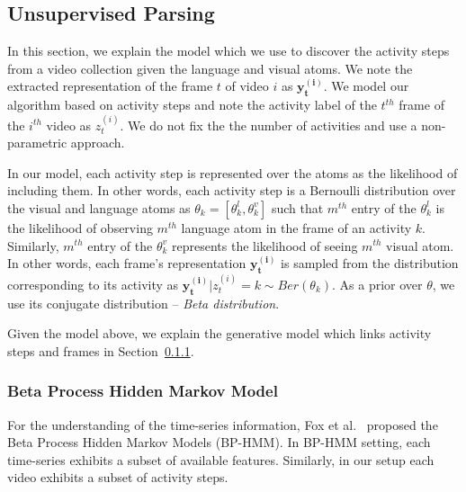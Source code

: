 

\subsection{Unsupervised Parsing}
\label{basics}
\label{learning}
In this section, we explain the model which we use to discover the activity steps from a video collection given the language and visual atoms. We note the extracted representation of the frame $t$ of video $i$ as $\mathbf{y^{(i)}_t}$. We model our algorithm based on activity steps and note the activity label of the $t^{th}$ frame of the $i^{th}$ video as $z^{(i)}_t$. We do not fix the the number of activities and use a non-parametric approach.


In our model, each activity step is represented over the atoms as the likelihood of including them. In other words, each activity step is a Bernoulli distribution over the visual and language atoms as $\theta_k=[\theta_k^l,\theta_k^v]$ such that $m^{th}$ entry of the $\theta_k^l$ is the likelihood of observing $m^{th}$ language atom in the frame of an activity $k$. Similarly, $m^{th}$ entry of the $\theta_k^v$ represents the likelihood of seeing $m^{th}$ visual atom. In other words, each frame's representation $\mathbf{y^{(i)}_t}$ is sampled from the distribution corresponding to its activity as \mbox{$\mathbf{y^{(i)}_t}|z^{(i)}_t=k \sim Ber(\theta_k)$}. As a prior over $\theta$, we use its conjugate distribution -- \emph{Beta distribution}.

Given the model above, we explain the generative model which links activity steps and frames in Section~\ref{bphmm}.
 
   \vskip -2mm
\subsubsection{Beta Process Hidden Markov Model}
\label{bphmm}
  \vskip -2mm
  
For the understanding of the time-series information, Fox et al.~\cite{foxBPHMM} proposed the Beta Process Hidden Markov Models (BP-HMM). In BP-HMM setting, each time-series exhibits a subset of available features. Similarly, in our setup each video exhibits a subset of activity steps.

